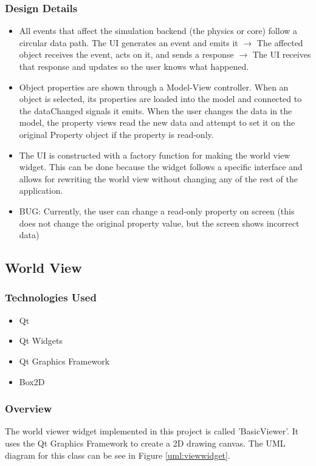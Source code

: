  \subsubsection*{Design Details}
 \begin{itemize}
 	\item All events that affect the simulation backend (the physics or core) follow a circular data path. The UI generates an event and emits it $\rightarrow$ The affected object receives the event, acts on it, and sends a response $\rightarrow$ The UI receives that response and updates so the user knows what happened.
 	\item Object properties are shown through a Model-View controller. When an object is selected, its properties are loaded into the model and connected to the dataChanged signals it emits. When the user changes the data in the model, the property views read the new data and attempt to set it on the original Property object if the property is read-only.
 	\item The UI is constructed with a factory function for making the world view widget. This can be done because the widget follows a specific interface and allows for rewriting the world view without changing any of the rest of the application.
 	\item BUG: Currently, the user can change a read-only property on screen (this does not change the original property value, but the screen shows incorrect data)
 \end{itemize}
\subsection{World View}
\subsubsection*{Technologies Used}
\begin{itemize}
	\item Qt
	\item Qt Widgets
	\item Qt Graphics Framework
	\item Box2D
\end{itemize}
\subsubsection*{Overview}
The world viewer widget implemented in this project is called 'BasicViewer'. It uses the Qt Graphics Framework to create a 2D drawing canvas. The UML diagram for this class can be see in Figure \ref{uml:viewwidget}.

